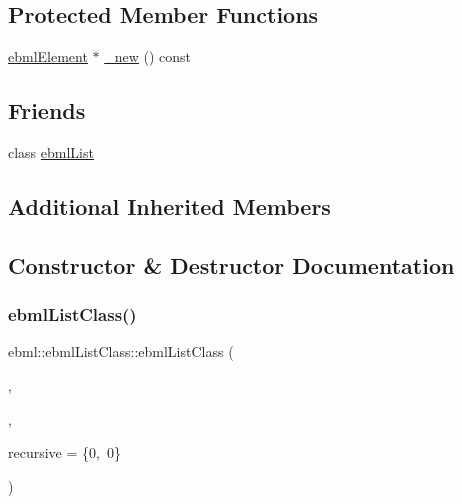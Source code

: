 \subsection*{Protected Member Functions}
\begin{DoxyCompactItemize}
\item 
\mbox{\hyperlink{classebml_1_1ebmlElement}{ebml\+Element}} $\ast$ \mbox{\hyperlink{classebml_1_1ebmlListClass_aef729ee70f218de1013c3782c481bffb}{\+\_\+new}} () const
\end{DoxyCompactItemize}
\subsection*{Friends}
\begin{DoxyCompactItemize}
\item 
class \mbox{\hyperlink{classebml_1_1ebmlListClass_af371b14231393d2eef62cb562cdd6e2d}{ebml\+List}}
\end{DoxyCompactItemize}
\subsection*{Additional Inherited Members}


\subsection{Constructor \& Destructor Documentation}
\mbox{\label{classebml_1_1ebmlListClass_ad49d85790f5d2b18dabf6180895f001d}} 
\subsubsection{\texorpdfstring{ebml\+List\+Class()}{ebmlListClass()}\hspace{0.1cm}{\footnotesize\ttfamily [1/6]}}
{\footnotesize\ttfamily ebml\+::ebml\+List\+Class\+::ebml\+List\+Class (\begin{DoxyParamCaption}\item[{const char $\ast$}]{,  }\item[{const std\+::wstring \&}]{,  }\item[{const \mbox{\hyperlink{structebml_1_1occurSpec__t}{occur\+Spec\+\_\+t}} \&}]{recursive = {\ttfamily \{0,~0\}} }\end{DoxyParamCaption})}

